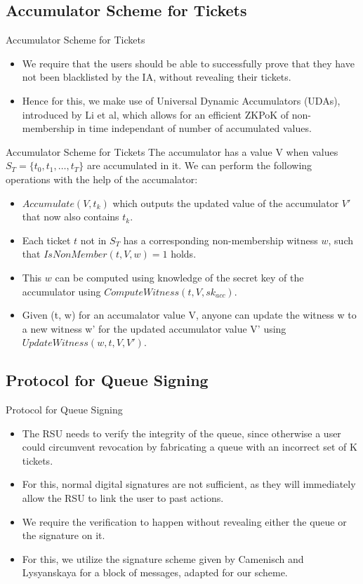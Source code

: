 \documentclass[
	xcolor={svgnames},
	hyperref={pagebackref,bookmarks},
	aspectratio=43,
]{beamer}
\begin{document}
\subsection{Accumulator Scheme for Tickets}
\begin{frame}{Accumulator Scheme for Tickets}
	\begin{itemize}[<alert@+>]
		\item We require that the users should be able to successfully prove that they have not been blacklisted by the IA, without revealing their tickets.
		\item Hence for this, we make use of Universal Dynamic Accumulators (UDAs), introduced by Li et al, which allows for an efficient ZKPoK of non-membership in time independant of number of accumulated values.
	\end{itemize}
\end{frame}
\begin{frame}{Accumulator Scheme for Tickets}
	The accumulator has a value V when values $S_T = \{ t_0, t_1, \dots, t_T \} $ are accumulated in it. We can perform the following operations with the help of the accumalator: 
	\begin{itemize}[<alert@+>]
		\item  $Accumulate(V, t_k)$ which outputs the updated value of the accumulator $V'$ that now also contains $t_k$.
		\item Each ticket $t$ not in $S_T$ has a corresponding non-membership witness $w$, such that $IsNonMember(t, V, w) = 1$ holds.
		\item This $w$ can be computed using knowledge of the secret key of the accumulator using $ComputeWitness(t, V, sk_{acc})$.
		\item Given (t, w) for an accumalator value V, anyone can update the witness w to a new witness w' for the updated accumulator value V' using $UpdateWitness(w, t, V, V')$.
	\end{itemize}
\end{frame}

\subsection{Protocol for Queue Signing}
\begin{frame}{Protocol for Queue Signing}
	\begin{itemize}[<alert@+>]
		\item The RSU needs to verify the integrity of the queue, since otherwise a user could circumvent revocation by fabricating a queue with an incorrect set of K tickets.
		\item For this, normal digital signatures are not sufficient, as they will immediately allow the RSU to link the user to past actions. 
		\item We require the verification to happen without revealing either the queue or the signature on it.  
		\item For this, we utilize the signature scheme given by Camenisch and Lysyanskaya for a block of messages, adapted for our scheme.
	\end{itemize}
\end{frame}
\end{document}
